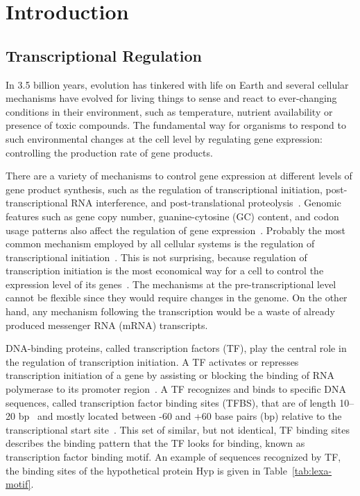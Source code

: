 
\chapter{Introduction}

\section{Transcriptional Regulation}

In 3.5 billion years, evolution has tinkered with life on Earth and several
cellular mechanisms have evolved for living things to sense and react to
ever-changing conditions in their environment, such as temperature, nutrient
availability or presence of toxic compounds. The fundamental way for organisms
to respond to such environmental changes at the cell level by regulating
gene expression: controlling the production rate of gene products.

There are a variety of mechanisms to control gene expression at different
levels of gene product synthesis, such as the regulation of transcriptional
initiation, post-transcriptional RNA interference, and post-translational
proteolysis~\citep{snyder2007molecular}. Genomic features such as gene copy
number, guanine-cytosine (GC) content, and codon usage patterns also affect the
regulation of gene expression~\citep{gustafsson2004codon,
  stranger2007relative}. Probably the most common mechanism employed by all
cellular systems is the regulation of transcriptional
initiation~\citep{browning2004regulation}. This is not surprising, because
regulation of transcription initiation is the most economical way for a cell to
control the expression level of its genes~\citep{malacinski2005essentials}. The
mechanisms at the pre-transcriptional level cannot be flexible since they would
require changes in the genome. On the other hand, any mechanism following the
transcription would be a waste of already produced messenger RNA (mRNA)
transcripts.

DNA-binding proteins, called transcription factors (TF), play the central role
in the regulation of transcription initiation. A TF activates or represses
transcription initiation of a gene by assisting or blocking the binding of RNA
polymerase to its promoter region~\citep{reznikoff1985regulation}. A TF
recognizes and binds to specific DNA sequences, called transcription factor
binding sites (TFBS), that are of length 10--20 bp~\citep{gerland2002physical,
  berg2004adaptive} and mostly located between -60 and +60 base pairs (bp)
relative to the transcriptional start site~\citep{collado1991control}. This set
of similar, but not identical, TF binding sites describes the binding pattern
that the TF looks for binding, known as transcription factor binding motif. An
example of sequences recognized by TF, the binding sites of the hypothetical
protein Hyp is given in Table~\ref{tab:lexa-motif}.

